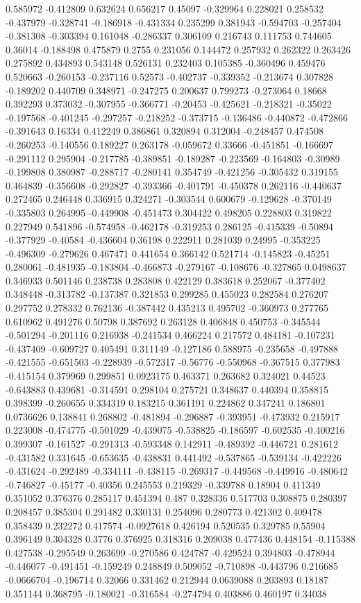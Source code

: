 0.585972 -0.412809 0.632624 0.656217 0.45097 -0.329964 0.228021 0.258532 -0.437979 -0.328741 -0.186918 -0.431334 0.235299 0.381943 -0.594703 -0.257404 -0.381308 -0.303394 0.161048 -0.286337 0.306109 0.216743 0.111753 0.744605 0.36014 -0.188498 0.475879 0.2755 0.231056 0.144472 0.257932 0.262322 0.263426 0.275892 0.434893 0.543148 0.526131 0.232403 0.105385 -0.360496 0.459476 0.520663 -0.260153 -0.237116 0.52573 -0.402737 -0.339352 -0.213674 0.307828 -0.189202 0.440709 0.348971 -0.247275 0.200637 0.799273 -0.273064 0.18668 0.392293 0.373032 -0.307955 -0.366771 -0.20453 -0.425621 -0.218321 -0.35022 -0.197568 -0.401245 -0.297257 -0.218252 -0.373715 -0.136486 -0.440872 -0.472866 -0.391643 0.16334 0.412249 0.386861 0.320894 0.312004 -0.248457 0.474508 -0.260253 -0.140556 0.189227 0.263178 -0.059672 0.33666 -0.451851 -0.166697 -0.291112 0.295904 -0.217785 -0.389851 -0.189287 -0.223569 -0.164803 -0.30989 -0.199808 0.380987 -0.288717 -0.280141 0.354749 -0.421256 -0.305432 0.319155 0.464839 -0.356608 -0.292827 -0.393366 -0.401791 -0.450378 0.262116 -0.440637 0.272465 0.246448 0.336915 0.324271 -0.303544 0.600679 -0.129628 -0.370149 -0.335803 0.264995 -0.449908 -0.451473 0.304422 0.498205 0.228803 0.319822 0.227949 0.541896 -0.574958 -0.462178 -0.319253 0.286125 -0.415339 -0.50894 -0.377929 -0.40584 -0.436604 0.36198 0.222911 0.281039 0.24995 -0.353225 -0.496309 -0.279626 0.467471 0.441654 0.366142 0.521714 -0.145823 -0.45251 0.280061 -0.481935 -0.183804 -0.466873 -0.279167 -0.108676 -0.327865 0.0498637 0.346933 0.501146 0.238738 0.283808 0.422129 0.383618 0.252067 -0.377402 0.348448 -0.313782 -0.137387 0.321853 0.299285 0.455023 0.282584 0.276207 0.297752 0.278332 0.762136 -0.387442 0.435213 0.495702 -0.360973 0.277765 0.610962 0.491276 0.50798 0.387692 0.263128 0.406848 0.450753 -0.345544 -0.501294 -0.201116 0.216938 -0.241534 0.466224 0.217572 0.484181 -0.107231 -0.437409 -0.609727 0.405491 0.311149 -0.127186 0.588975 -0.235658 -0.497888 -0.421555 -0.651503 -0.228939 -0.572317 -0.56776 -0.550968 -0.367515 0.377983 -0.415154 0.379969 0.299851 0.0923175 0.463371 0.263682 0.324021 0.44523 -0.643883 0.439681 -0.314591 0.298104 0.275721 0.348637 0.440394 0.358815 0.398399 -0.260655 0.334319 0.183215 0.361191 0.224862 0.347241 0.186801 0.0736626 0.138841 0.268802 -0.481894 -0.296887 -0.393951 -0.473932 0.215917 0.223008 -0.474775 -0.501029 -0.439075 -0.538825 -0.186597 -0.602535 -0.400216 0.399307 -0.161527 -0.291313 -0.593348 0.142911 -0.489392 -0.446721 0.281612 -0.431582 0.331645 -0.653635 -0.438831 0.441492 -0.537865 -0.539134 -0.422226 -0.431624 -0.292489 -0.334111 -0.438115 -0.269317 -0.449568 -0.449916 -0.480642 -0.746827 -0.45177 -0.40356 0.245553 0.219329 -0.339788 0.18904 0.411349 0.351052 0.376376 0.285117 0.451394 0.487 0.328336 0.517703 0.308875 0.280397 0.208457 0.385304 0.291482 0.330131 0.254096 0.280773 0.421302 0.409478 0.358439 0.232272 0.417574 -0.0927618 0.426194 0.520535 0.329785 0.55904 0.396149 0.304328 0.3776 0.376925 0.318316 0.209038 0.477436 0.448154 -0.115388 0.427538 -0.295549 0.263699 -0.270586 0.424787 -0.429524 0.394803 -0.478944 -0.446077 -0.491451 -0.159249 0.248849 0.509052 -0.710898 -0.443796 0.216685 -0.0666704 -0.196714 0.32066 0.331462 0.212944 0.0639088 0.203893 0.18187 0.351144 0.368795 -0.180021 -0.316584 -0.274794 0.403886 0.460197 0.34038 